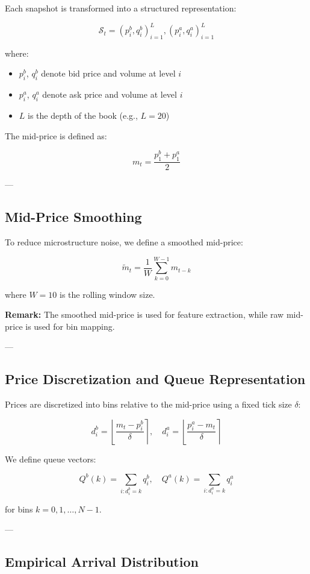 \documentclass[12pt,a4paper]{report}
\begin{document}
Each snapshot is transformed into a structured representation:

\[
\mathcal{S}_t ={ (p^b_i, q^b_i)_{i=1}^{L},  (p^a_i, q^a_i)_{i=1}^{L} }
\]

where:
\begin{itemize}
\item $p^b_i$, $q^b_i$ denote bid price and volume at level $i$
\item $p^a_i$, $q^a_i$ denote ask price and volume at level $i$
\item $L$ is the depth of the book (e.g., $L=20$)
\end{itemize}

The mid-price is defined as:

\[
m_t = \frac{p^b_1 + p^a_1}{2}
\]

---

\subsection{Mid-Price Smoothing}

To reduce microstructure noise, we define a smoothed mid-price:

\[
\tilde{m}_t = \frac{1}{W} \sum_{k=0}^{W-1} m_{t-k}
\]

where $W=10$ is the rolling window size.

\textbf{Remark:} The smoothed mid-price is used for feature extraction, while raw mid-price is used for bin mapping.

---

\subsection{Price Discretization and Queue Representation}

Prices are discretized into bins relative to the mid-price using a fixed tick size $\delta$:

\[
d^b_i = \left\lfloor \frac{m_t - p^b_i}{\delta} \right\rceil, \quad
d^a_i = \left\lfloor \frac{p^a_i - m_t}{\delta} \right\rceil
\]

We define queue vectors:

\[
Q^b(k) = \sum_{i: d^b_i = k} q^b_i, \quad
Q^a(k) = \sum_{i: d^a_i = k} q^a_i
\]

for bins $k = 0, 1, \dots, N-1$.

---

\subsection{Empirical Arrival Distribution}
\end{document}
